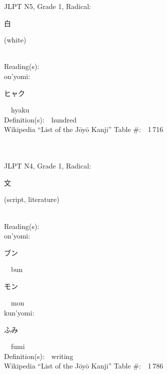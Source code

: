 \begin{multicols}{2}
{JLPT N5, Grade 1, Radical:\ \ {\begin{CJK}{UTF8}{min} 白 \end{CJK}} (white) } \\
Reading(s):\ \ \\
{\hspace*{1em}}on'yomi:\ \ \\
{\hspace*{2em}}{\begin{CJK}{UTF8}{min} ヒャク \end{CJK}}\ \ hyaku\ \ \\
Definition(s):\ \ hundred \\
Wikipedia ``List of the J\=oy\=o Kanji'' Table \#:\ \ 1\,716 \\
\ \ \\
{\fontsize{34pt}{40pt}  }\ \ \\  %
{JLPT N4, Grade 1, Radical:\ \ {\begin{CJK}{UTF8}{min} 文 \end{CJK}} (script, literature) } \\
Reading(s):\ \ \\
{\hspace*{1em}}on'yomi:\ \ \\
{\hspace*{2em}}{\begin{CJK}{UTF8}{min} ブン \end{CJK}}\ \ bun\ \ \\
{\hspace*{2em}}{\begin{CJK}{UTF8}{min} モン \end{CJK}}\ \ mon\ \ \\
{\hspace*{1em}}kun'yomi:\ \ \\
{\hspace*{2em}}{\begin{CJK}{UTF8}{min} ふみ \end{CJK}}\ \ fumi\ \ \\
Definition(s):\ \ writing \\
Wikipedia ``List of the J\=oy\=o Kanji'' Table \#:\ \ 1\,786 \\
\ \ \\
{\fontsize{34pt}{40pt}  }\ \ \\  %

\end{multicols}
